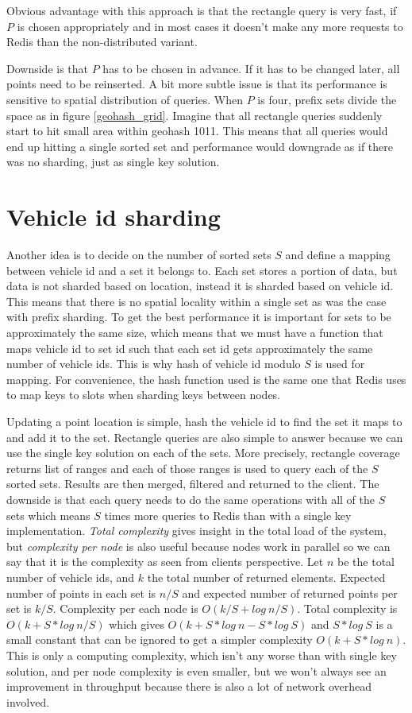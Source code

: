\documentclass[times, utf8, diplomski]{fer}
\begin{document}
Obvious advantage with this approach is that the rectangle query is very fast, if $P$ is chosen appropriately and in most cases it doesn't make any more requests to Redis than the non-distributed variant.

Downside is that $P$ has to be chosen in advance. If it has to be changed later, all points need to be reinserted. A bit more subtle issue is that its performance is sensitive to spatial distribution of queries. When  $P$ is four, prefix sets divide the space as in figure \ref{geohash_grid}. Imagine that all rectangle queries suddenly start to hit small area within geohash 1011. This means that all queries would end up hitting a single sorted set and performance would downgrade as if there was no sharding, just as single key solution.

\section {Vehicle id sharding} \label {vehicle_id}
Another idea is to decide on the number of sorted sets $S$ and define a mapping between vehicle id and a set it belongs to. Each set stores a portion of data, but data is not sharded based on location, instead it is sharded based on vehicle id. This means that there is no spatial locality within a single set as was the case with prefix sharding. To get the best performance it is important for sets to be approximately the same size, which means that we must have a function that maps vehicle id to set id such that each set id gets approximately the same number of vehicle ids. This is why hash of vehicle id modulo $S$ is used for mapping. For convenience, the hash function used is the same one that Redis uses to map keys to slots when sharding keys between nodes.

Updating a point location is simple, hash the vehicle id to find the set it maps to and add it to the set. Rectangle queries are also simple to answer because we can use the single key solution on each of the sets. More precisely, rectangle coverage returns list of ranges and each of those ranges is used to query each of the $S$ sorted sets. Results are then merged, filtered and returned to the client. The downside is that each query needs to do the same operations with all of the $S$ sets which means $S$ times more queries to Redis than with a single key implementation. \emph{Total complexity} gives insight in the total load of the system, but \emph{complexity per node} is also useful because nodes work in parallel so we can say that it is the complexity as seen from clients perspective. Let $n$ be the total number of vehicle ids, and $k$ the total number of returned elements. Expected number of points in each set is $n/S$ and expected number of returned points per set is $k/S$. Complexity per each node is $O(k/S + log\ n/S)$. Total complexity is $O(k + S*log\ n/S)$ which gives $O(k + S*log\ n - S*log\ S)$ and $S*log\ S$ is a small constant that can be ignored to get a simpler complexity $O(k + S*log\ n)$. This is only a computing complexity, which isn't any worse than with single key solution, and per node complexity is even smaller, but we won't always see an improvement in throughput because there is also a lot of network overhead involved.
\end{document}
